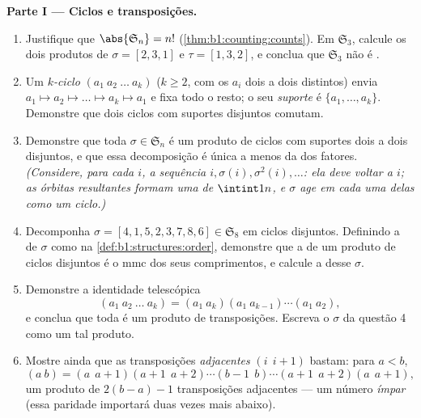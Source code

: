 \begin{problem}
\medskip
\noindent\textbf{Parte I --- Ciclos e transposições.}
\begin{enumerate}
  \item Justifique que $\abs{\mathfrak S_n} = n!$
        (\cref{thm:b1:counting:counts}). Em $\mathfrak S_3$,
        calcule os dois produtos de $\sigma = [2, 3, 1]$ e $\tau =
        [1, 3, 2]$, e conclua que $\mathfrak S_3$ não é
        .
  \item Um \emph{$k$-ciclo} $(a_1\ a_2\ \dots\ a_k)$ ($k \geq 2$,
        com os $a_i$ dois a dois distintos) envia $a_1 \mapsto a_2
        \mapsto \dots \mapsto a_k \mapsto a_1$ e fixa
        todo o resto; o seu \emph{suporte} é $\{a_1, \dots,
        a_k\}$. Demonstre que dois ciclos com suportes disjuntos
        comutam.
  \item Demonstre que toda $\sigma \in \mathfrak S_n$ é um produto
        de ciclos com suportes dois a dois disjuntos, e que essa
        decomposição é única a menos da  dos fatores.
        \emph{(Considere, para cada $i$, a sequência $i, \sigma(i),
        \sigma^2(i), \dots$: ela deve voltar a $i$; as \emph{órbitas}
        resultantes formam uma  de $\intint1n$, e $\sigma$ age em
        cada uma delas como um ciclo.)}
  \item Decomponha $\sigma = [4, 1, 5, 2, 3, 7, 8, 6] \in
        \mathfrak S_8$ em ciclos disjuntos. Definindo a
        \emph{} de $\sigma$ como na
        \cref{def:b1:structures:order}, demonstre que a  de um
        produto de ciclos disjuntos é o mmc dos seus comprimentos,
        e calcule a  desse $\sigma$.
  \item Demonstre a identidade telescópica
        \[
        (a_1\ a_2\ \dots\ a_k)
        = (a_1\ a_k)(a_1\ a_{k-1})\cdots(a_1\ a_2) ,
        \]
        e conclua que toda  é um produto de
        transposições. Escreva o $\sigma$ da questão 4 como um tal
        produto.
  \item Mostre ainda que as transposições \emph{adjacentes}
        $(i\ \ i{+}1)$ bastam: para $a < b$,
        \[
        (a\ b) = (a\ \ a{+}1)(a{+}1\ \ a{+}2)\cdots(b{-}1\ \ b)
        \cdots(a{+}1\ \ a{+}2)(a\ \ a{+}1),
        \]
        um produto de $2(b - a) - 1$ transposições adjacentes ---
        um número \emph{ímpar} (essa paridade importará duas vezes
        mais abaixo).
\end{enumerate}


\end{problem}
